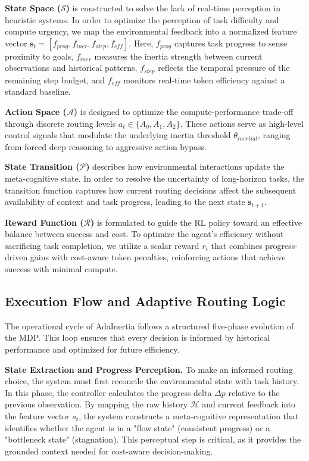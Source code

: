 \documentclass[runningheads]{llncs}
\begin{document}
\textbf{State Space ($\mathcal{S}$)} is constructed to solve the lack of real-time perception in heuristic systems. In order to optimize the perception of task difficulty and compute urgency, we map the environmental feedback into a normalized feature vector $\mathbf{s}_t = [f_{prog}, f_{iner}, f_{step}, f_{eff}]$. Here, $f_{prog}$ captures task progress to sense proximity to goals, $f_{iner}$ measures the inertia strength between current observations and historical patterns, $f_{step}$ reflects the temporal pressure of the remaining step budget, and $f_{eff}$ monitors real-time token efficiency against a standard baseline. 

\textbf{Action Space ($\mathcal{A}$)} is designed to optimize the compute-performance trade-off through discrete routing levels $a_t \in \{A_0, A_1, A_2\}$. These actions serve as high-level control signals that modulate the underlying inertia threshold $\theta_{inertial}$, ranging from forced deep reasoning to aggressive action bypass.

\textbf{State Transition ($\mathcal{P}$)} describes how environmental interactions update the meta-cognitive state. In order to resolve the uncertainty of long-horizon tasks, the transition function captures how current routing decisions affect the subsequent availability of context and task progress, leading to the next state $\mathbf{s}_{t+1}$.

\textbf{Reward Function ($\mathcal{R}$)} is formulated to guide the RL policy toward an effective balance between success and cost. To optimize the agent's efficiency without sacrificing task completion, we utilize a scalar reward $r_t$ that combines progress-driven gains with cost-aware token penalties, reinforcing actions that achieve success with minimal compute.

\subsection{Execution Flow and Adaptive Routing Logic}
The operational cycle of AdaInertia follows a structured five-phase evolution of the MDP. This loop ensures that every decision is informed by historical performance and optimized for future efficiency.

\textbf{State Extraction and Progress Perception.} To make an informed routing choice, the system must first reconcile the environmental state with task history. In this phase, the controller calculates the progress delta $\Delta p$ relative to the previous observation. By mapping the raw history $\mathcal{H}$ and current feedback into the feature vector $s_t$, the system constructs a meta-cognitive representation that identifies whether the agent is in a "flow state" (consistent progress) or a "bottleneck state" (stagnation). This perceptual step is critical, as it provides the grounded context needed for cost-aware decision-making.
\end{document}
